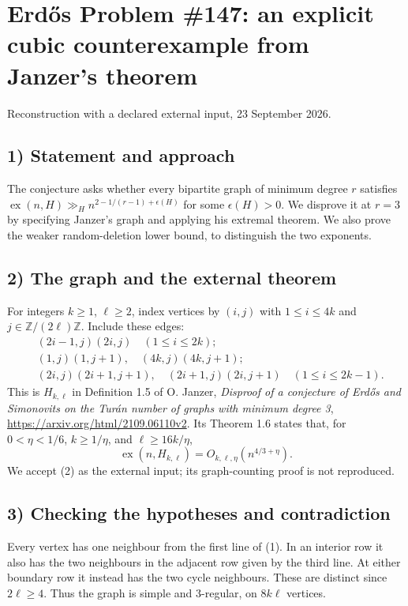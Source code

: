 \section{Erd\H{o}s Problem \#147: an explicit cubic counterexample from Janzer's theorem}
\noindent Reconstruction with a declared external input, 23 September 2026.

\subsection*{1) Statement and approach}
The conjecture asks whether every bipartite graph of minimum degree $r$ satisfies $\operatorname{ex}(n,H)\gg_H n^{2-1/(r-1)+\epsilon(H)}$ for some $\epsilon(H)>0$. We disprove it at $r=3$ by specifying Janzer's graph and applying his extremal theorem. We also prove the weaker random-deletion lower bound, to distinguish the two exponents.

\subsection*{2) The graph and the external theorem}
For integers $k\ge1$, $\ell\ge2$, index vertices by $(i,j)$ with $1\le i\le4k$ and $j\in\mathbb Z/(2\ell)\mathbb Z$. Include these edges:
\[
 \begin{split}
 &(2i-1,j)(2i,j)\quad(1\le i\le2k);\\
 &(1,j)(1,j+1),\quad(4k,j)(4k,j+1);\\
 &(2i,j)(2i+1,j+1),\quad(2i+1,j)(2i,j+1)
       \quad(1\le i\le2k-1).
 \end{split}\tag{1}
\]
This is $H_{k,\ell}$ in Definition 1.5 of O. Janzer, \emph{Disproof of a conjecture of Erd\H{o}s and Simonovits on the Tur\'an number of graphs with minimum degree 3}, \url{https://arxiv.org/html/2109.06110v2}. Its Theorem 1.6 states that, for $0<\eta<1/6$, $k\ge1/\eta$, and $\ell\ge16k/\eta$,
\[
 \operatorname{ex}(n,H_{k,\ell})=O_{k,\ell,\eta}(n^{4/3+\eta}).\tag{2}
\]
We accept (2) as the external input; its graph-counting proof is not reproduced.

\subsection*{3) Checking the hypotheses and contradiction}
Every vertex has one neighbour from the first line of (1). In an interior row it also has the two neighbours in the adjacent row given by the third line. At either boundary row it instead has the two cycle neighbours. These are distinct since $2\ell\ge4$. Thus the graph is simple and 3-regular, on $8k\ell$ vertices.

